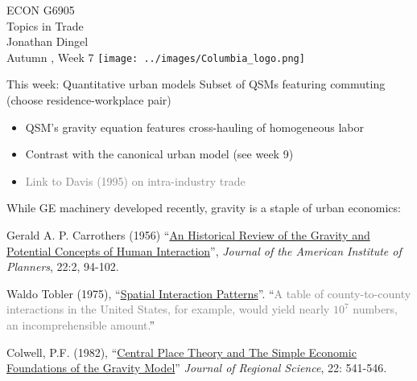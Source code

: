 \documentclass[11pt,notes=hide,aspectratio=169]{beamer}
\begin{document}
\begin{frame}[plain]
\begin{center}
\large
\textcolor{columbiadarkblue}{ECON G6905\\
Topics in Trade\\ 
Jonathan Dingel\\
Autumn \the\year, Week 7}
\vfill 
\texttt{[image: ../images/Columbia\_logo.png]}
\end{center}
\end{frame}
\begin{frame}{This week: Quantitative urban models}
Subset of QSMs featuring commuting (choose residence-workplace pair)
\begin{itemize}
\item QSM's gravity equation features cross-hauling of homogeneous labor
\item Contrast with the canonical urban model (see week 9)\\
\item[] \textcolor{gray}{Link to Davis (1995) on intra-industry trade}
\end{itemize}
\smallskip
While GE machinery developed recently, gravity is a staple of urban economics:
\begin{itemize}{\small
\item Gerald A. P. Carrothers (1956) ``\href{https://doi.org/10.1080/01944365608979229}{An Historical Review of the Gravity and Potential Concepts of Human Interaction}'', \textit{Journal of the American Institute of Planners}, 22:2, 94-102.
\item Waldo Tobler (1975), ``\href{https://pure.iiasa.ac.at/id/eprint/241/1/RR-75-019.pdf}{Spatial Interaction Patterns}''. ``\textcolor{gray}{A table of county-to-county interactions in the United States, for example, would yield nearly $10^7$ numbers, an incomprehensible amount.}''
\item Colwell, P.F. (1982), ``\href{https://doi.org/10.1111/j.1467-9787.1982.tb00775.x}{Central Place Theory and The Simple Economic Foundations of the Gravity Model}'' \textit{Journal of Regional Science}, 22: 541-546.
}\end{itemize}
\end{frame}
\end{document}
